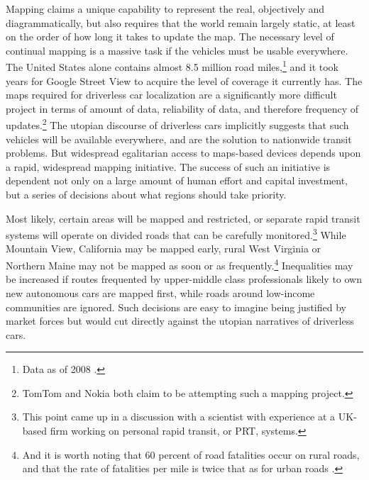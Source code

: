 Mapping claims a unique capability to
represent the real, objectively
and diagrammatically, but also requires that the world remain largely
static, at least on the order of how long it takes to update the map.
The necessary level of continual mapping is a massive task if the 
vehicles must be usable everywhere. The United States alone contains almost
8.5 million road miles,\footnote{Data as of 2008 \cite{carneyMiles}.}
and it took years for Google Street View to acquire the level of
coverage it currently has. The maps required for driverless car
localization are a significantly more difficult project in terms of
amount of data, reliability of data, and therefore frequency of
updates.\footnote{TomTom \cite{tomtommaps} and Nokia \cite{ubergizmo}
  both claim to be attempting such 
a mapping project.} The utopian discourse of driverless cars
implicitly suggests that such vehicles will be available everywhere,
and are the solution to nationwide transit problems. But widespread
egalitarian access to maps-based devices depends upon a rapid,
widespread mapping initiative. The success of such an initiative is
dependent not only on a large amount of human effort and capital
investment, but a series of decisions about what regions should take priority.

Most likely,
certain areas will be 
mapped and restricted, or separate rapid transit
systems will operate on divided roads that can be carefully
monitored.\footnote{This point came up in a discussion with a
  scientist with experience at a UK-based firm working on personal
  rapid transit, or PRT, systems.} While
Mountain View, California may be mapped early, rural West Virginia or
Northern Maine may not be mapped as soon or as
frequently.\footnote{And it is worth noting that 60 percent of road
  fatalities occur on rural roads, and that the rate of fatalities per
mile is twice that as for urban roads \cite[p. 11]{broviakCars}.}
Inequalities may be increased if routes frequented by upper-middle
class professionals likely to own new autonomous cars
are mapped first, while roads around low-income communities are
ignored. Such decisions are easy to imagine being justified by
market forces but would
cut directly against the utopian narratives of driverless cars.

